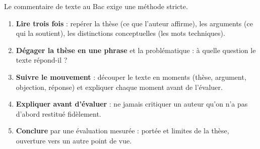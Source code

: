 \documentclass[11pt]{article}
\begin{document}
\begin{methode}
Le commentaire de texte au Bac exige une méthode stricte.
\begin{enumerate}
\item \textbf{Lire trois fois} : repérer la thèse (ce que l'auteur affirme), les arguments (ce qui la soutient), les distinctions conceptuelles (les mots techniques).
\item \textbf{Dégager la thèse en une phrase} et la problématique : à quelle question le texte répond-il ?
\item \textbf{Suivre le mouvement} : découper le texte en moments (thèse, argument, objection, réponse) et expliquer chaque moment avant de l'évaluer.
\item \textbf{Expliquer avant d'évaluer} : ne jamais critiquer un auteur qu'on n'a pas d'abord restitué fidèlement.
\item \textbf{Conclure} par une évaluation mesurée : portée et limites de la thèse, ouverture vers un autre point de vue.
\end{enumerate}
\end{methode}
\end{document}
